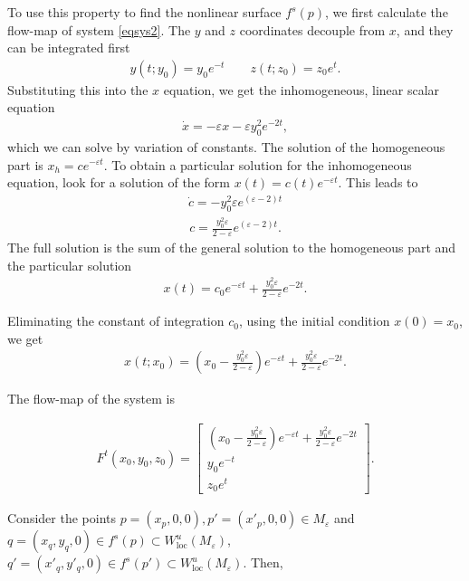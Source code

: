 \begin{solution}[9.5]
\begin{enumerate}
To use this property to find the nonlinear surface $f^s(p)$, we first calculate the flow-map of system \eqref{eqsys2}. The $y$ and $z$ coordinates decouple from $x$, and they can be integrated first
\begin{align}
y(t;y_0) = y_0e^{-t} \qquad z(t;z_0) = z_0e^{t}.
\end{align}
Substituting this into the $x$ equation, we get the inhomogeneous, linear scalar equation
\begin{align}
    \dot{x} = -\varepsilon x - \varepsilon y_0^2 e^{-2t}, 
\end{align}
which we can solve by variation of constants. The solution of the homogeneous part is $x_h = ce^{-\varepsilon t}$. To obtain a particular solution for the inhomogeneous equation, look for a solution of the form $x(t)=c(t)e^{-\varepsilon t}$. This leads to
\begin{align}
\dot{c} = -y_0^2\varepsilon e^{(\varepsilon-2)t}
\end{align}
\begin{align}
c = \frac{y_0^2 \varepsilon }{2-\varepsilon}e^{(\varepsilon-2)t}.
\end{align}
The full solution is the sum of the general solution to the homogeneous part and the particular solution
\begin{align}
x(t) = c_0e^{-\varepsilon t} + \frac{y_0^2 \varepsilon }{2-\varepsilon}e^{-2t}.
\end{align}

Eliminating the constant of integration $c_0$, using the initial condition $x(0) = x_0$, we get
\begin{align}
x(t;x_0) = \left(x_0 - \frac{y_0^2 \varepsilon }{2-\varepsilon}\right)e^{-\varepsilon t} + \frac{y_0^2\varepsilon}{2-\varepsilon}e^{-2t}.
\end{align}

The flow-map of the system is 

\begin{align}
\label{eqflowmap2}
F^t(x_0,y_0,z_0) = \begin{bmatrix}
\left(x_0 - \frac{y_0^2 \varepsilon }{2-\varepsilon}\right)e^{-\varepsilon t} + \frac{y_0^2\varepsilon}{2-\varepsilon}e^{-2t} \\
y_0e^{-t} \\
z_0e^{t}
\end{bmatrix}.
\end{align}


Consider the points $p = (x_p, 0, 0), p' = (x'_p, 0, 0)\in M_\varepsilon $ and $q = (x_q, y_q, 0) \in f^s(p)\subset W^u_{\text{loc}}(M_\varepsilon)$, $q' = (x'_q, y'_q, 0)\in f^s(p')\subset W^u_{\text{loc}}(M_\varepsilon)$.
Then, 


\end{enumerate}
\end{solution}
